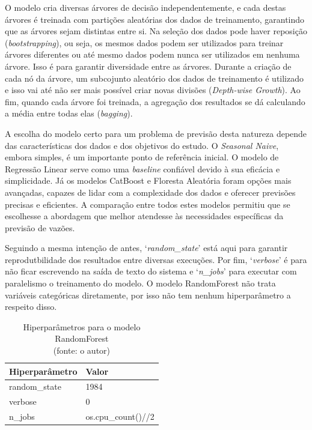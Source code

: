 O modelo cria diversas árvores de decisão independentemente, e cada destas árvores é treinada com partições aleatórias dos dados de treinamento, garantindo que as árvores sejam distintas entre si. Na seleção dos dados pode haver reposição (\textit{bootstrapping}), ou seja, os mesmos dados podem ser utilizados para treinar árvores diferentes ou até mesmo dados podem nunca ser utilizados em nenhuma árvore. Isso é para garantir diversidade entre as árvores. Durante a criação de cada nó da árvore, um subcojunto aleatório dos dados de treinamento é utilizado e isso vai até não ser mais possível criar novas divisões (\textit{Depth-wise Growth}). Ao fim, quando cada árvore foi treinada, a agregação dos resultados se dá calculando a média entre todas elas (\textit{bagging}).\cite{hasan_ahmed_salman_2024}\cite{sklearn_random_forest_2024}

A escolha do modelo certo para um problema de previsão desta natureza depende das características dos dados e dos objetivos do estudo. O \textit{Seasonal Naive}, embora simples, é um importante ponto de referência inicial. O modelo de Regressão Linear serve como uma \textit{baseline} confiável devido à sua eficácia e simplicidade. Já os modelos CatBoost e Floresta Aleatória foram opções mais avançadas, capazes de lidar com a complexidade dos dados e oferecer previsões precisas e eficientes. A comparação entre todos estes modelos permitiu que se escolhesse a abordagem que melhor atendesse às necessidades específicas da previsão de vazões.

Seguindo a mesma intenção de antes, `\textit{random\_state}' está aqui para garantir reprodutbilidade dos resultados entre diversas execuções. Por fim, `\textit{verbose}' é para não ficar escrevendo na saída de texto do sistema e `\textit{n\_jobs}' para executar com paralelismo o treinamento do modelo. O modelo RandomForest não trata variáveis categóricas diretamente, por isso não tem nenhum hiperparâmetro a respeito disso.

\begin{table}[!h]
	\centering \small
	\caption{Hiperparâmetros para o modelo RandomForest\\(fonte: o autor)}
	\begin{tabular}{|l|l|} \hline 
		\textbf{Hiperparâmetro} & \textbf{Valor}     \\\hline
		random\_state           & 1984               \\\hline
		verbose                 & 0                  \\\hline
		n\_jobs                 & os.cpu\_count()//2 \\\hline
	\end{tabular}
	\label{tab:hiperparametros_randomforest}
\end{table}


